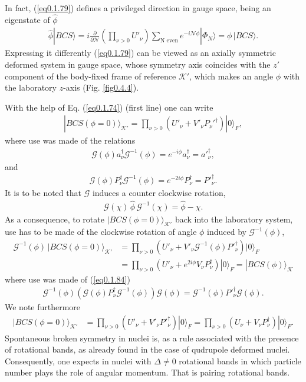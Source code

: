 \documentclass[a4paper,11pt]{book}
\numberwithin{equation}{section}
\numberwithin{figure}{section}
\numberwithin{table}{section}
\newcommand{\ket}[1]{|{#1} \rangle }
\begin{document}
In fact, (\ref{eq0.1.79}) defines a privileged direction in gauge space, being an eigenstate of $\hat\phi$ 
\begin{align}\label{eq0.1.83}
\hat\phi\ket{BCS}=i\frac{\partial}{\partial \mathcal N}\left(\prod_{\nu>0}U'_\nu\right)\sum_{\text{N even}}e^{-i\mathcal N\phi}\ket{\Phi_{N}}=\phi\,\ket{BCS}.
\end{align}
Expressing it differently (\ref{eq0.1.79}) can be viewed as an axially symmetric deformed system in gauge space, whose symmetry axis coincides with the $z'$ component of the body-fixed frame of reference $\mathcal K'$, which makes an angle $\phi$ with the laboratory $z$-axis (Fig. \ref{fig0.4.4}). 

With the help of Eq. (\ref{eq0.1.74}) (first line) one can write
\begin{align}\label{eq0.1.84}
\ket{BCS(\phi=0)}_{\mathcal K'}=\prod_{\nu>0}\left(U'_\nu+V'_\nu P_\nu'^\dagger\right)\ket{0}_F,
\end{align}
where use was made of the relations
\begin{align}\label{eq0.1.85}
\mathcal G(\phi)a^\dagger_\nu \mathcal G^{-1}(\phi)=e^{-i\phi}a^\dagger_\nu=a'^\dagger_\nu,
\end{align}
and 
\begin{align}\label{eq0.1.86}
\mathcal G(\phi)P^\dagger_\nu \mathcal G^{-1}(\phi)=e^{-2i\phi}P^\dagger_\nu=P'^\dagger_\nu.
\end{align}
It is to be noted that $\mathcal G$ induces a counter clockwise rotation,
\begin{align}\label{eq0.1.87}
\mathcal G(\chi)\,\hat\phi\, \mathcal G^{-1}(\chi)=\hat\phi-\chi.
\end{align}
As a consequence, to rotate $\ket{BCS(\phi=0)}_{\mathcal K'}$ back into the laboratory system, use has to be made of the clockwise rotation of angle $\phi$ induced by $\mathcal G^{-1}(\phi)$,
\begin{align}\label{eq0.1.88}
\nonumber \mathcal G^{-1}(\phi)\,\ket{BCS(\phi=0)}_{\mathcal K'}&=\prod_{\nu>0}\left(U'_\nu+V'_\nu\mathcal G^{-1}(\phi)P'^\dagger_\nu\right)\ket{0}_F\\
&=\prod_{\nu>0}\left(U'_\nu+e^{2i\phi}V_\nu P^\dagger_\nu\right)\ket{0}_F=\ket{BCS(\phi)}_{\mathcal K}
\end{align}
where use was made of (\ref{eq0.1.84})
\begin{align}\label{eq0.1.89}
\mathcal G^{-1}(\phi)\left(\mathcal G(\phi)P^\dagger_\nu\mathcal G^{-1}(\phi)\right)\mathcal G(\phi)=\mathcal G^{-1}(\phi)P'^\dagger_\nu\mathcal G(\phi).
\end{align}
We note furthermore 
\begin{align}\label{eq0.1.90}
\ket{BCS(\phi=0)}_{\mathcal K'}&=\prod_{\nu>0}\left(U'_\nu+V'_\nu P'^\dagger_\nu\right)\ket{0}_F=\prod_{\nu>0}\left(U_\nu+V_\nu P^\dagger_\nu\right)\ket{0}_F.
\end{align}
Spontaneous broken symmetry in nuclei is, as a rule associated with the presence of rotational bands, as already found in the case of qudrupole deformed nuclei. Consequently, one expects in nuclei with $\Delta\neq0$ rotational bands in which particle number plays the role of angular momentum. That is pairing rotational bands. 
\end{document}

